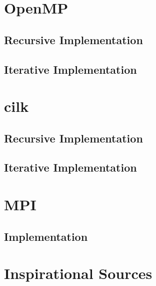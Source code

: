\documentclass[12pt,a4paper,titlepage,oneside]{scrartcl}
\begin{document}
\section{OpenMP}
	\subsection{Recursive Implementation}
	
	\subsection{Iterative Implementation}
	
	
\section{cilk}
	\subsection{Recursive Implementation}
	
	\subsection{Iterative Implementation}
	

\section{MPI}
	\subsection{Implementation}
	
\pagebreak
\section{Inspirational Sources}
	 
%
%
\end{document}
